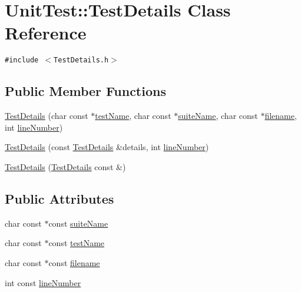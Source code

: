\hypertarget{class_unit_test_1_1_test_details}{
\section{UnitTest::TestDetails Class Reference}
\label{class_unit_test_1_1_test_details}
}
{\tt \#include $<$TestDetails.h$>$}

\subsection*{Public Member Functions}
\begin{CompactItemize}
\item 
\hyperlink{class_unit_test_1_1_test_details_9317f51ef0865b042c8180ea691eccaa}{TestDetails} (char const $\ast$\hyperlink{class_unit_test_1_1_test_details_88446b0c9bf84e3cb7d33b6584c9077a}{testName}, char const $\ast$\hyperlink{class_unit_test_1_1_test_details_4ab111817a7c2e627b77ecfc91e1bcf0}{suiteName}, char const $\ast$\hyperlink{class_unit_test_1_1_test_details_6e704305c58485f37fcabfe1f7c35723}{filename}, int \hyperlink{class_unit_test_1_1_test_details_a55e2a9270e7b3b4da8169761376ee0c}{lineNumber})
\item 
\hyperlink{class_unit_test_1_1_test_details_780f29f93d4e7016ee3426ad5ea62cb3}{TestDetails} (const \hyperlink{class_unit_test_1_1_test_details}{TestDetails} \&details, int \hyperlink{class_unit_test_1_1_test_details_a55e2a9270e7b3b4da8169761376ee0c}{lineNumber})
\item 
\hyperlink{class_unit_test_1_1_test_details_fc3836360e570a6c6a1b696c2ee2f73d}{TestDetails} (\hyperlink{class_unit_test_1_1_test_details}{TestDetails} const \&)
\end{CompactItemize}
\subsection*{Public Attributes}
\begin{CompactItemize}
\item 
char const $\ast$const \hyperlink{class_unit_test_1_1_test_details_4ab111817a7c2e627b77ecfc91e1bcf0}{suiteName}
\item 
char const $\ast$const \hyperlink{class_unit_test_1_1_test_details_88446b0c9bf84e3cb7d33b6584c9077a}{testName}
\item 
char const $\ast$const \hyperlink{class_unit_test_1_1_test_details_6e704305c58485f37fcabfe1f7c35723}{filename}
\item 
int const \hyperlink{class_unit_test_1_1_test_details_a55e2a9270e7b3b4da8169761376ee0c}{lineNumber}
\end{CompactItemize}



